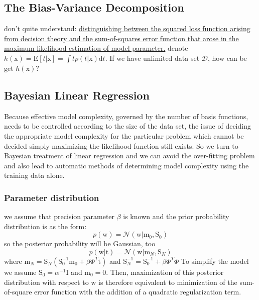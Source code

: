 \documentclass[a4paper]{book}
\begin{document}
\subsection{The Bias-Variance Decomposition}
don't quite understand:\newline
\uline{distinguishing between the squared loss function arising from decision theory and the sum-of-squares error function that arose in the maximum likelihood estimation of model parameter.}
denote $h(\mathrm x) = \mathrm E[t|\mathrm x] = \int tp(t|\mathrm x)\mathrm dt$. If we have unlimited data set $\mathcal D$, how can be get $h(\mathrm x)$?

\subsection{ Bayesian Linear Regression}
Because effective model complexity, governed by the number of basis functions, needs to be controlled according to the size of the data set, the issue of deciding the appropriate model complexity for the particular problem which cannot be decided simply maximizing the likelihood function still exists. So we turn to Bayesian treatment of linear regression and we can avoid the over-fitting problem and also lead to automatic methods of determining model complexity using the training data alone.
\subsubsection{Parameter distribution}
we assume that precision parameter $\beta$ is known and the prior  probability distribution is as the form:
\begin{equation}\label{eq2.2.4}
  p(\mathrm w) =\mathcal N(\mathrm w|\mathrm m_0,\mathrm S_0)
\end{equation}
so the posterior probability will be Gaussian, too
\begin{equation}\label{eq2.2.5}
  p(\mathrm w|\mathrm t) = \mathcal N(\mathrm w|\mathrm m_N,\mathrm S_N)
\end{equation}
where $\mathrm m_N=\mathrm S_N(\mathrm S_0^{-1}\mathrm m_0+\beta \Phi^T\mathrm t)$ and $\mathrm S_N^{-1}=\mathrm S_0^{-1}+\beta\Phi^T\Phi$\newline
To simplify the model we assume $\mathrm S_0 = \alpha^{-1}\mathrm I$ and $ \mathrm m_0=\mathrm 0$. Then, maximization of this posterior distribution with respect to $\mathrm w$ is therefore equivalent to minimization of the sum-of-square error function with the addition of a quadratic regularization term.
\end{document}
